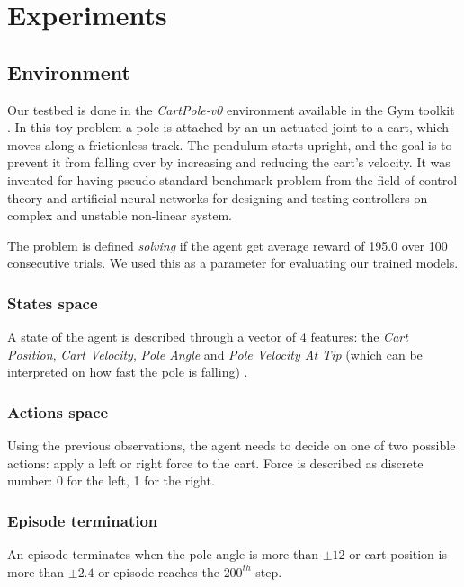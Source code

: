 \section{Experiments}

\subsection{Environment}
Our testbed is done in the \textit{CartPole-v0} environment available in the Gym toolkit \cite{Gym}.
In this toy problem a pole is attached by an un-actuated joint to a cart, which moves along a frictionless track. The pendulum starts upright, and the goal is to prevent it from falling over by increasing and reducing the cart's velocity. It was invented for having pseudo-standard benchmark problem from the field of control theory and artificial neural networks for designing and testing controllers on complex and unstable non-linear system.

The problem is defined \textit{solving} if the agent get average reward of 195.0 over 100 consecutive trials. We used this as a parameter for evaluating our trained models.
 
\subsubsection{States space}
A state of the agent is described through a vector of 4 features: the  \textit{Cart Position}, \textit{Cart Velocity}, \textit{Pole Angle} and \textit{Pole Velocity At Tip} (which can be interpreted on how fast the pole is falling) .

\subsubsection{Actions space}
Using the previous observations, the agent needs to decide on one of two possible actions: apply a left or right force to the cart. Force is described as discrete number: 0 for the left, 1 for the right.




\subsubsection{Episode termination}
An episode terminates when the pole angle is more than $\pm12$ or cart position is more than $\pm2.4$ or episode reaches the $200^{th}$ step.

